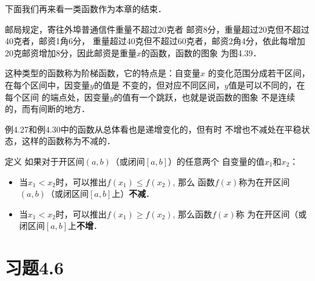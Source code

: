 下面我们再来看一类函数作为本章的结束．

\begin{example}
邮局规定，寄往外埠普通信件重量不超过20克者
邮资8分，重量超过20克但不超过40克者，邮资1角6分，
重量超过40克但不超过60克者，邮资2角4分，依此每增加
20克邮资增加8分，因此邮资是重量$x$的函数，函数的图象
为图4.39．
\begin{figure}[htp]
    \centering
{}
    \caption{}
\end{figure}

这种类型的函数称为阶梯函数，它的特点是：自变量$x$
的变化范围分成若干区间，在每个区间中，因变量$y$的值是
不变的，但对应不同区间，$y$值是可以不同的，在每个区间
的端点处，因变量$y$的值有一个跳跃，也就是说函数的图象
不是连续的，而有间断的地方．

例4.27和例4.30中的函数从总体看也是递增变化的，但有时
不增也不减处在平稳状态，这样的函数称为不减的．

    
\end{example}

\begin{blk}{定义}
    如果对于开区间$(a,b)$（或闭间$[a,b]$）的任意两个
  自变量的值$x_1$和$x_2$：
  \begin{itemize}
      \item 当$x_1<x_2$时，可以推出$f(x_1)\le f(x_2)$, 那么
  函数$f(x)$称为在开区间$(a,b)$（或闭区间$[a,b]$上）\textbf{不减}．
\item  当$x_1<x_2$时，可以推出$f(x_1)\ge f(x_2)$, 那么函数$f(x)$称
  为在开区间（或闭区间$[a,b]$上\textbf{不增}．   
  \end{itemize}
  \end{blk}
  
  
  



\section*{习题4.6}

